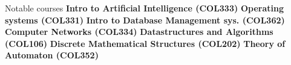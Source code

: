 \begin{rubric}{Notable courses}
    \entry*
    \textbf{Intro to Artificial Intelligence (COL333)}
    \entry*
    \textbf{Operating systems (COL331)}
    \entry*
    \textbf{Intro to Database Management sys. (COL362)}
    \entry*
    \textbf{Computer Networks (COL334)}
    \entry*
    \textbf{Datastructures and Algorithms (COL106)}
    \entry*
    \textbf{Discrete Mathematical Structures (COL202)}
    \entry*
    \textbf{Theory of Automaton (COL352)}
\end{rubric}
